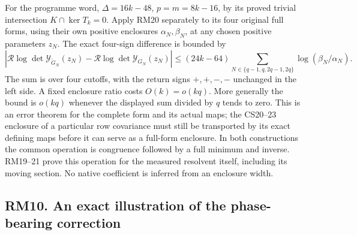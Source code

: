 \documentclass[11pt]{article}
\begin{document}
For the programme word, \(\Delta=16k-48\), \(p=m=8k-16\), by its proved trivial intersection \(K\cap\ker T_k=0\). Apply RM20 separately to its four original full forms, using their own positive enclosures \(\alpha_N,\beta_N\), at any chosen positive parameters \(z_N\). The exact four-sign difference is bounded by \[
 \boxed{\left|\mathcal R\log\det\mathscr Y_{\widetilde G_N}(z_N)
       -\mathcal R\log\det\mathscr Y_{G_N}(z_N)\right|
 \le(24k-64)\sum_{N\in\{q-1,q,2q-1,2q\}}
                 \log(\beta_N/\alpha_N).}
 \tag{RM21}
\] The sum is over four cutoffs, with the return signs \(+,+,-,-\) unchanged in the left side. A fixed enclosure ratio costs \(O(k)=o(kq)\). More generally the bound is \(o(kq)\) whenever the displayed sum divided by \(q\) tends to zero. This is an error theorem for the complete form and its actual maps; the CS20--23 enclosure of a particular row covariance must still be transported by its exact defining maps before it can serve as a full-form enclosure. In both constructions the common operation is congruence followed by a full minimum and inverse. RM19--21 prove this operation for the measured resolvent itself, including its moving section. No native coefficient is inferred from an enclosure width.

\subsection{RM10. An exact illustration of the phase-bearing correction}\label{rm10.-an-exact-illustration-of-the-phase-bearing-correction}
\end{document}

